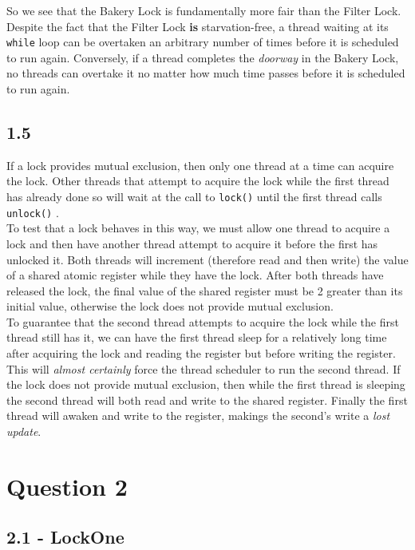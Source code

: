 \documentclass[11pt, letterpaper]{article}
\newcommand{\code}[1] { \texttt{#1} }
\begin{document}
So we see that the Bakery Lock is fundamentally more fair than the Filter Lock. Despite the fact that the Filter Lock \textbf{is} starvation-free, a thread waiting at its \code{while} loop can be overtaken an arbitrary number of times before it is scheduled to run again. Conversely, if a thread completes the \textit{doorway} in the Bakery Lock, no threads can overtake it no matter how much time passes before it is scheduled to run again.

\subsection*{1.5}
\label{sub:1_5}

If a lock provides mutual exclusion, then only one thread at a time can acquire the lock. Other threads that attempt to acquire the lock while the first thread has already done so will wait at the call to \code{lock()} until the first thread calls \code{unlock()}.\\

To test that a lock behaves in this way, we must allow one thread to acquire a lock and then have another thread attempt to acquire it before the first has unlocked it. Both threads will increment (therefore read and then write) the value of a shared atomic register while they have the lock. After both threads have released the lock, the final value of the shared register must be 2 greater than its initial value, otherwise the lock does not provide mutual exclusion.\\

To guarantee that the second thread attempts to acquire the lock while the first thread still has it, we can have the first thread sleep for a relatively long time after acquiring the lock and reading the register but before writing the register. This will \textit{almost certainly} force the thread scheduler to run the second thread. If the lock does not provide mutual exclusion, then while the first thread is sleeping the second thread will both read and write to the shared register. Finally the first thread will awaken and write to the register, makings the second's write a \textit{lost update}.

\newpage
\section*{Question 2}
\label{sec:question_2}

\subsection*{2.1 - LockOne}
\label{sub:2_1_lockone}
\end{document}
